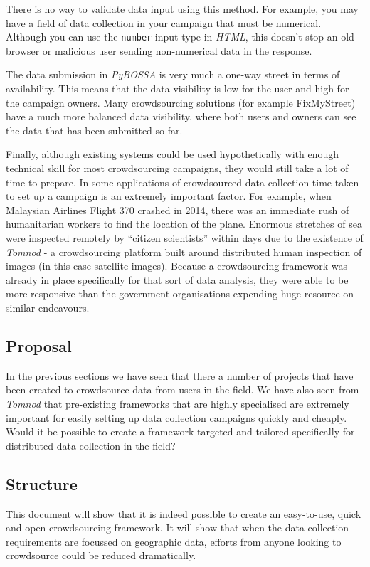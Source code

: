 \documentclass{article}
\begin{document}
		There is no way to validate data input using this method. For example, you may have a field of data collection in your campaign that must be numerical. Although you can use the \texttt{number} input type in \emph{HTML}, this doesn't stop an old browser or malicious user sending non-numerical data in the response.

		The data submission in \emph{PyBOSSA} is very much a one-way street in terms of availability. This means that the data visibility is low for the user and high for the campaign owners. Many crowdsourcing solutions (for example FixMyStreet) have a much more balanced data visibility, where both users and owners can see the data that has been submitted so far.

		Finally, although existing systems could be used hypothetically with enough technical skill for most crowdsourcing campaigns, they would still take a lot of time to prepare. In some applications of crowdsourced data collection time taken to set up a campaign is an extremely important factor. For example, when Malaysian Airlines Flight 370 crashed in 2014, there was an immediate rush of humanitarian workers to find the location of the plane. Enormous stretches of sea were inspected remotely by ``citizen scientists'' within days due to the existence of \emph{Tomnod} - a crowdsourcing platform built around distributed human inspection of images (in this case satellite images)\cite{_missing_2014}. Because a crowdsourcing framework was already in place specifically for that sort of data analysis, they were able to be more responsive than the government organisations expending huge resource on similar endeavours.

		\subsection{Proposal}
		In the previous sections we have seen that there a number of projects that have been created to crowdsource data from users in the field. We have also seen from \emph{Tomnod} that pre-existing frameworks that are highly specialised are extremely important for easily setting up data collection campaigns quickly and cheaply. Would it be possible to create a framework targeted and tailored specifically for distributed data collection in the field?

		\subsection{Structure}
		This document will show that it is indeed possible to create an easy-to-use, quick and open crowdsourcing framework. It will show that when the data collection requirements are focussed on geographic data, efforts from anyone looking to crowdsource could be reduced dramatically.
\end{document}

